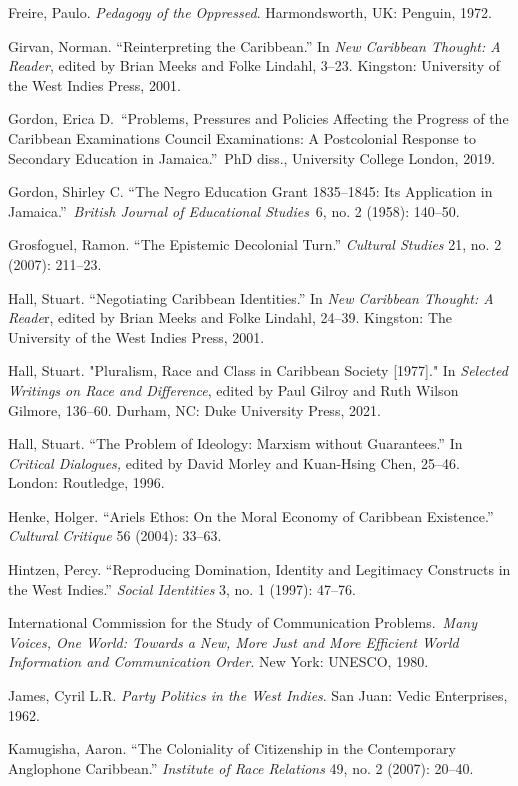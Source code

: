 \documentclass{tufte-handout}
\begin{document}
\begin{hangparas}{.25in}{1}
Freire, Paulo. \emph{Pedagogy of the Oppressed}. Harmondsworth, UK:
Penguin, 1972.

Girvan, Norman. ``Reinterpreting the Caribbean.'' In \emph{New Caribbean
Thought: A Reader}, edited by Brian Meeks and Folke Lindahl, 3--23.
Kingston: University of the West Indies Press, 2001.

Gordon, Erica D.~``Problems, Pressures and Policies Affecting the
Progress of the Caribbean Examinations Council Examinations: A
Postcolonial Response to Secondary Education in Jamaica.''~PhD diss.,
University College London, 2019.

Gordon, Shirley C. ``The Negro Education Grant 1835--1845: Its
Application in Jamaica.''~\emph{British Journal of Educational
Studies}~6, no. 2 (1958): 140--50.

Grosfoguel, Ramon. ``The Epistemic Decolonial Turn.'' \emph{Cultural
Studies} 21, no. 2 (2007): 211--23.

Hall, Stuart. ``Negotiating Caribbean Identities.'' In \emph{New
Caribbean Thought: A Reade}r, edited by Brian Meeks and Folke Lindahl,
24--39. Kingston: The University of the West Indies Press, 2001.

Hall, Stuart. "Pluralism, Race and Class in Caribbean Society
{[}1977{]}." In \emph{Selected Writings on Race and Difference}, edited
by Paul Gilroy and Ruth Wilson Gilmore, 136­--60. Durham, NC: Duke
University Press, 2021.


Hall, Stuart. ``The Problem of Ideology: Marxism without Guarantees.''
In \emph{Critical Dialogues,} edited by David Morley and Kuan-Hsing
Chen, 25--46. London: Routledge, 1996.

Henke, Holger. ``Ariel\textquotesingle s Ethos: On the Moral Economy of
Caribbean Existence.'' \emph{Cultural Critique} 56 (2004): 33--63.

Hintzen, Percy. ``Reproducing Domination, Identity and Legitimacy
Constructs in the West Indies.'' \emph{Social Identities} 3, no. 1
(1997): 47--76.

International Commission for the Study of Communication
Problems.~\emph{Many Voices, One World: Towards a New, More Just and
More Efficient World Information and Communication Order}. New York:
UNESCO, 1980.

James, Cyril L.R. \emph{Party Politics in the West Indies}. San Juan:
Vedic Enterprises, 1962.

Kamugisha, Aaron. ``The Coloniality of Citizenship in the Contemporary
Anglophone Caribbean.'' \emph{Institute of Race Relations} 49, no. 2
(2007): 20--40.


\end{hangparas}
\end{document}
